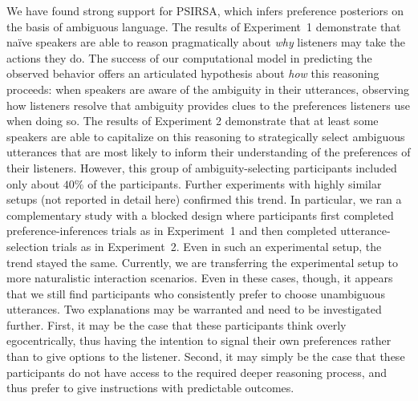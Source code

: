 \documentclass[10pt,a4paper]{article}
\newcommand{\gcs}[1]{\textcolor{blue}{[gcs: #1]}}
\begin{document}
We have found strong support for PSIRSA, which infers preference posteriors on the basis of ambiguous language.
The results of Experiment~1 demonstrate that na\"ive speakers are able to reason pragmatically about \emph{why} listeners may take the actions they do. 
The success of our computational model in predicting the observed behavior offers an articulated hypothesis about \emph{how} this reasoning proceeds: when speakers are aware of the ambiguity in their utterances, observing how listeners resolve that ambiguity provides clues to the preferences listeners use when doing so.
The results of Experiment 2 demonstrate that at least some speakers are able to capitalize on this reasoning to strategically select ambiguous utterances that are most likely to inform their understanding of the preferences of their listeners.
However, this group of ambiguity-selecting participants included only about $40\%$ of the participants. 
Further experiments with highly similar setups (not reported in detail here) confirmed this trend. 
In particular, we ran a complementary study with a blocked design where participants first completed preference-inferences trials as in Experiment~1 and then completed utterance-selection trials as in Experiment~2. 
Even in such an experimental setup, the trend stayed the same. 
Currently, we are transferring the experimental setup to more naturalistic interaction scenarios. 
Even in these cases, though, it appears that we still find participants who consistently prefer to choose unambiguous utterances. 
Two explanations may be warranted and need to be investigated further. 
First, it may be the case that these participants think overly egocentrically, thus having the intention to signal their own preferences rather than to give options to the listener. 
Second, it may simply be the case that these participants do not have access to the required deeper reasoning process, and thus prefer to give instructions with predictable outcomes. 
\end{document}
